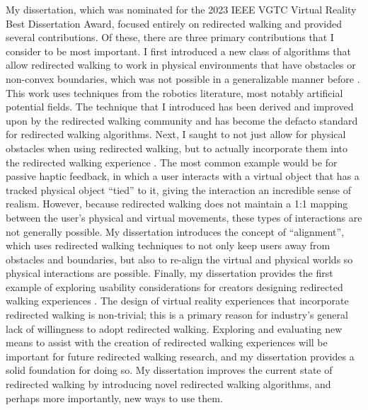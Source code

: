 My dissertation, which was nominated for the 2023 IEEE VGTC Virtual Reality Best Dissertation Award, focused entirely on redirected walking and provided several contributions. Of these, there are three primary contributions that I consider to be most important. I first introduced a new class of algorithms that allow redirected walking to work in physical environments that have obstacles or non-convex boundaries, which was not possible in a generalizable manner before \cite{thomas2019general}. This work uses techniques from the robotics literature, most notably artificial potential fields. The technique that I introduced has been derived and improved upon by the redirected walking community and has become the defacto standard for redirected walking algorithms. Next, I saught to not just allow for physical obstacles when using redirected walking, but to actually incorporate them into the redirected walking experience \cite{thomas2020towards, thomas2020reactive, thomas2022inverse}. The most common example would be for passive haptic feedback, in which a user interacts with a virtual object that has a tracked physical object ``tied'' to it, giving the interaction an incredible sense of realism. However, because redirected walking does not maintain a 1:1 mapping between the user's physical and virtual movements, these types of interactions are not generally possible. My dissertation introduces the concept of ``alignment'', which uses redirected walking techniques to not only keep users away from obstacles and boundaries, but also to re-align the virtual and physical worlds so physical interactions are possible. Finally, my dissertation provides the first example of exploring usability considerations for creators designing redirected walking experiences \cite{thomas2022inverse}. The design of virtual reality experiences that incorporate redirected walking is non-trivial; this is a primary reason for industry's general lack of willingness to adopt redirected walking. Exploring and evaluating new means to assist with the creation of redirected walking experiences will be important for future redirected walking research, and my dissertation provides a solid foundation for doing so. My dissertation improves the current state of redirected walking by introducing novel redirected walking algorithms, and perhaps more importantly, new ways to use them. 

